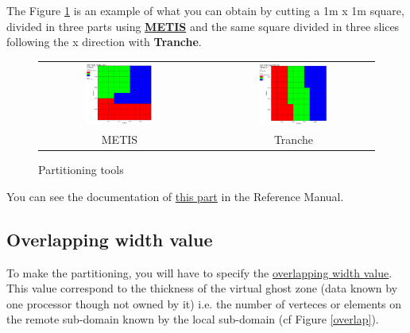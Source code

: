 \vspace{1cm}
The Figure \ref{partitioning} is an example of what you can obtain by cutting a 1m x 1m square, divided in three parts using \href{http://glaros.dtc.umn.edu/gkhome/views/metis}{\textbf{METIS}} and the same square divided in three slices following the x direction with \textbf{Tranche}.

\begin{figure}[h!]
\begin{centering}
\begin{tabular}{ccc}
\includegraphics[width=0.45\textwidth]{partition_metis.jpeg} & & \includegraphics[width=0.45\textwidth]{partition_tranche.jpeg}\tabularnewline
METIS & & Tranche\tabularnewline
\end{tabular}
\par\end{centering}
\caption{Partitioning tools}
\label{partitioning}
\end{figure}

You can see the documentation of \href{TRUST_Reference_Manual.pdf\#partition}{this part} in the \trust Reference Manual.



\subsection{Overlapping width value}
To make the partitioning, you will have to specify the \underline{overlapping width value}.
This value correspond to the thickness of the virtual ghost zone (data known by one processor though not owned by it) i.e. the number of verteces or elements on the remote sub-domain known by the local sub-domain (cf Figure \ref{overlap}).

